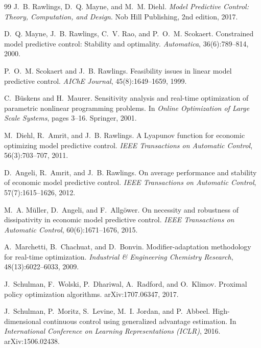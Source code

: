 \documentclass[11pt,a4paper,twoside,openright]{report}
\theoremstyle{plain}
\theoremstyle{definition}
\theoremstyle{remark}
\begin{document}
\begin{thebibliography}{99}
		J.~B. Rawlings, D.~Q. Mayne, and M.~M. Diehl.
		\newblock \emph{Model Predictive Control: Theory, Computation, and Design}.
		\newblock Nob Hill Publishing, 2nd edition, 2017.

		D.~Q. Mayne, J.~B. Rawlings, C.~V. Rao, and P.~O.~M. Scokaert.
		\newblock Constrained model predictive control: Stability and optimality.
		\newblock \emph{Automatica}, 36(6):789--814, 2000.

		P.~O.~M. Scokaert and J.~B. Rawlings.
		\newblock Feasibility issues in linear model predictive control.
		\newblock \emph{AIChE Journal}, 45(8):1649--1659, 1999.

		C.~B\"uskens and H.~Maurer.
		\newblock Sensitivity analysis and real-time optimization of parametric
		nonlinear programming problems.
		\newblock In \emph{Online Optimization of Large Scale Systems}, pages 3--16.
		Springer, 2001.

		M.~Diehl, R.~Amrit, and J.~B. Rawlings.
		\newblock A Lyapunov function for economic optimizing model predictive control.
		\newblock \emph{IEEE Transactions on Automatic Control}, 56(3):703--707, 2011.

		D.~Angeli, R.~Amrit, and J.~B. Rawlings.
		\newblock On average performance and stability of economic model predictive
		control.
		\newblock \emph{IEEE Transactions on Automatic Control}, 57(7):1615--1626, 2012.

		M.~A. M\"uller, D.~Angeli, and F.~Allg\"ower.
		\newblock On necessity and robustness of dissipativity in economic model
		predictive control.
		\newblock \emph{IEEE Transactions on Automatic Control}, 60(6):1671--1676, 2015.

		A.~Marchetti, B.~Chachuat, and D.~Bonvin.
		\newblock Modifier-adaptation methodology for real-time optimization.
		\newblock \emph{Industrial \& Engineering Chemistry Research},
		48(13):6022--6033, 2009.

		J.~Schulman, F.~Wolski, P.~Dhariwal, A.~Radford, and O.~Klimov.
		\newblock Proximal policy optimization algorithms.
		\newblock arXiv:1707.06347, 2017.

		J.~Schulman, P.~Moritz, S.~Levine, M.~I. Jordan, and P.~Abbeel.
		\newblock High-dimensional continuous control using generalized advantage
		estimation.
		\newblock In \emph{International Conference on Learning Representations (ICLR)},
		2016. arXiv:1506.02438.


\end{thebibliography}
\end{document}
